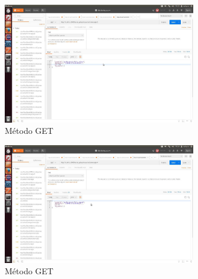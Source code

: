 \documentclass[12pt,a4paper, spanish]{article}
\begin{document}
\begin{figure}[H]
	\centering
	\includegraphics[width=0.75\textwidth]{images/captura24.jpg}
	\caption{Método GET}
\end{figure}

\begin{figure}[H]
	\centering
	\includegraphics[width=0.75\textwidth]{images/captura25.jpg}
	\caption{Método GET}
\end{figure}
\end{document}
